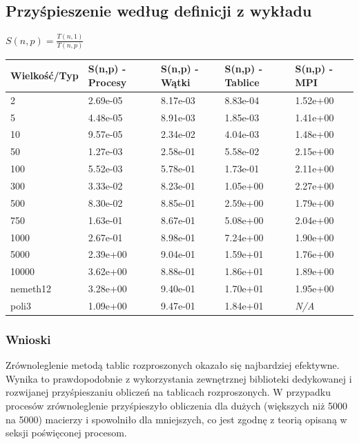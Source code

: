\subsection{Przyśpieszenie według definicji z wykładu}    
$S(n, p) = \frac{T(n, 1)}{T(n, p)} $
\begin{table}[H]
    \centering
    \begin{tabular}{|l|l|l|l|l|}
    \hline
    \textbf{Wielkość/Typ} & \textbf{S(n,p) - Procesy} & \textbf{S(n,p) - Wątki} & \textbf{S(n,p) - Tablice} & \textbf{S(n,p) - MPI} \\ \hline
    2 & 2.69e-05 & 8.17e-03 & 8.83e-04 & 1.52e+00 \\ \hline
    5 & 4.48e-05 & 8.91e-03 & 1.85e-03 & 1.41e+00 \\ \hline
    10 & 9.57e-05 & 2.34e-02 & 4.04e-03 & 1.48e+00 \\ \hline
    50 & 1.27e-03 & 2.58e-01 & 5.58e-02 & 2.15e+00 \\ \hline
    100 & 5.52e-03 & 5.78e-01 & 1.73e-01 & 2.11e+00 \\ \hline
    300 & 3.33e-02 & 8.23e-01 & 1.05e+00 & 2.27e+00 \\ \hline
    500 & 8.30e-02 & 8.85e-01 & 2.59e+00 & 1.79e+00 \\ \hline
    750 & 1.63e-01 & 8.67e-01 & 5.08e+00 & 2.04e+00 \\ \hline
    1000 & 2.67e-01 & 8.98e-01 & 7.24e+00 & 1.90e+00 \\ \hline
    5000 & 2.39e+00 & 9.04e-01 & 1.59e+01 & 1.76e+00 \\ \hline
    10000 & 3.62e+00 & 8.88e-01 & 1.86e+01 & 1.89e+00 \\ \hline
    nemeth12 & 3.28e+00 & 9.40e-01 & 1.70e+01 & 1.95e+00 \\ \hline
    poli3 & 1.09e+00 & 9.47e-01 & 1.84e+01 & \textit{N/A} \\ \hline
    \end{tabular}
    \label{tab:calculated_speedup}
\end{table}

\subsubsection{Wnioski}
Zrównoleglenie metodą tablic rozproszonych okazało się najbardziej efektywne. Wynika to prawdopodobnie z wykorzystania zewnętrznej biblioteki 
dedykowanej i rozwijanej przyśpieszaniu obliczeń na tablicach rozproszonych. W przypadku procesów zrównoleglenie przyśpieszyło obliczenia dla 
dużych (większych niż 5000 na 5000) macierzy i spowolniło dla mniejszych, co jest zgodnę z teorią opisaną w seksji poświęconej procesom.
 \\ 
